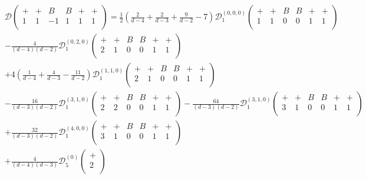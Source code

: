 \begin{equation}
\begin{split}
&\mathcal{D}
\begin{pmatrix}
+ & + & B & B & + & + \\
1 & 1 & -1 & 1 & 1 & 1  \\
\end{pmatrix} = 
\frac{1}{2}\left(\frac{2}{d-4}+\frac{2}{d-3}+\frac{9}{d-2}-7\right)\mathcal{D}_1^{(0,0,0)}
\begin{pmatrix}
+ & + & B & B & + & + \\
1 & 1 & 0 & 0 & 1 & 1  \\
\end{pmatrix} \\
&-\frac{4}{(d-4)(d-2)}\mathcal{D}_1^{(0,2,0)}
\begin{pmatrix}
+ & + & B & B & + & + \\
2 & 1 & 0 & 0 & 1 & 1  \\
\end{pmatrix} \\
&+4\left(\frac{1}{d-4}+\frac{4}{d-3}-\frac{11}{d-2}\right)\mathcal{D}_1^{(1,1,0)}
\begin{pmatrix}
+ & + & B & B & + & + \\
2 & 1 & 0 & 0 & 1 & 1  \\
\end{pmatrix} \\
&-\frac{16}{(d-3)(d-2)}\mathcal{D}_1^{(3,1,0)}
\begin{pmatrix}
+ & + & B & B & + & + \\
2 & 2 & 0 & 0 & 1 & 1  \\
\end{pmatrix} 
-\frac{64}{(d-3)(d-2)}\mathcal{D}_1^{(3,1,0)}
\begin{pmatrix}
+ & + & B & B & + & + \\
3 & 1 & 0 & 0 & 1 & 1  \\
\end{pmatrix} \\
&+\frac{32}{(d-3)(d-2)}\mathcal{D}_1^{(4,0,0)}
\begin{pmatrix}
+ & + & B & B & + & + \\
3 & 1 & 0 & 0 & 1 & 1  \\
\end{pmatrix} \\
&+\frac{4}{(d-4)(d-3)}\mathcal{D}_5^{(0)}
\begin{pmatrix}
+ \\
2 \\
\end{pmatrix} 

\end{split}
\end{equation}
